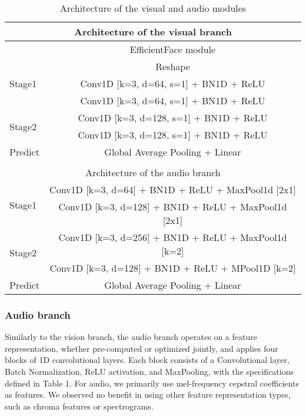 \documentclass[a4paper,conference]{IEEEtran}
\begin{document}
\begin{table}[]
\centering
\begin{tabular}{|l|c|}
\multicolumn{2}{c}{Architecture of the visual branch} \\
\hline
     & EfficientFace module                              \\
\hline
\multirow{3}{*}{Stage1} & Reshape                                           \\
                        & Conv1D {[}k=3, d=64, s=1{]} + 
                        BN1D + ReLU  \\
                        & Conv1D {[}k=3, d=64, s=1{]} +
                        BN1D + ReLU  \\
                        \hline
\multirow{2}{*}{Stage2} & Conv1D {[}k=3, d=128, s=1{]} +
                         BN1D + ReLU \\
                        & Conv1D {[}k=3, d=128, s=1{]} + 
                         BN1D + ReLU \\ \hline
Predict                & Global Average Pooling + Linear        \\ \hline          
\multicolumn{2}{c}{ } \\
\multicolumn{2}{c}{Architecture of the audio branch} \\ \hline
\multirow{2}{*}{Stage1} & Conv1D {[}k=3, d=64{]} + BN1D + ReLU + MaxPool1d [2x1]                                   \\ 
                        & Conv1D {[}k=3, d=128{]} + BN1D + ReLU + MaxPool1d [2x1]    \\ \hline                                
\multirow{2}{*}{Stage2}                  & Conv1D {[}k=3, d=256{]} + BN1D + ReLU + MaxPool1d [k=2]                                    \\
                        & Conv1D {[}k=3, d=128{]} + BN1D + ReLU + MPool1D [k=2]                                   \\
                        \hline
Predict                 & Global Average Pooling + Linear                  \\ \hline
\end{tabular}
\caption{Architecture of the visual and audio modules}
\end{table}

\subsubsection{Audio branch}
Similarly to the vision branch, the audio branch operates on a feature representation, whether pre-computed or optimized jointly, and applies four blocks of 1D convolutional layers. Each block consists of a Convolutional layer, Batch Normalization, ReLU activation, and MaxPooling, with the specifications defined in Table 1.
For audio, we primarily use mel-frequency cepstral coefficients as features. We observed no benefit in using other feature representation types, such as chroma features or spectrograms. 
\end{document}
